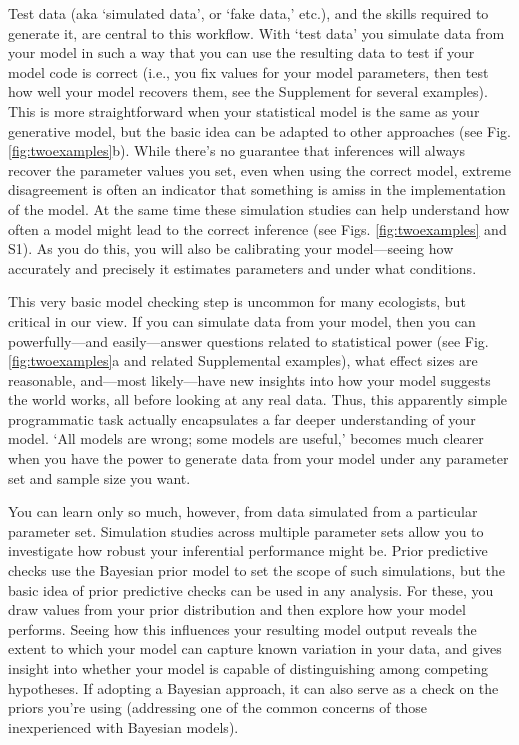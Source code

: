 \documentclass[11pt]{article}
\newcommand{\R}[1]{\label{}\linelabel{#1}}
\begin{document}
Test data (aka `simulated data', or  `fake data,' etc.), and the skills required to generate it, are central to this workflow. With `test data' you simulate data from your model in such a way that you can use the resulting data to test if your model code is correct (i.e., you fix values for your model parameters, then test how well your model recovers them, see the Supplement for several examples). This is more straightforward when your statistical model is the same as your generative model, but the basic idea can be adapted to other approaches (see Fig. \ref{fig:twoexamples}b).\R{beyondMCMC5} While there's no guarantee that inferences will always recover the parameter values you set, even when using the correct model, extreme disagreement is often an indicator that something is amiss in the implementation of the model. At the same time these simulation studies can help understand how often a model might lead to the correct inference (see Figs. \ref{fig:twoexamples} and S1). As you do this, you will also be calibrating your model---seeing how accurately and precisely it estimates parameters and under what conditions. 

This very basic model checking step is uncommon for many ecologists, but critical in our view. If you can simulate data from your model, then you can powerfully---and easily---answer questions related to statistical power (see Fig. \ref{fig:twoexamples}a and related Supplemental examples), what effect sizes are reasonable, and---most likely---have new insights into how your model suggests the world works, all before looking at any real data. Thus, this apparently simple programmatic task actually encapsulates a far deeper understanding of your model. `All models are wrong; some models are useful,' becomes much clearer when you have the power to generate data from your model under any parameter set and sample size you want.

You can learn only so much, however, from data simulated from a particular parameter set. Simulation studies across multiple parameter sets allow you to investigate how robust your inferential performance might be. Prior predictive checks \citep{betanprior,winter2023} use the Bayesian prior model to set the scope of such simulations, but the basic idea of prior predictive checks can be used in any analysis. For these, you draw values from your prior distribution and then explore how your model performs. Seeing how this influences your resulting model output 
reveals the extent to which your model can capture known variation in your data, and gives insight into whether your model is capable of distinguishing among competing hypotheses. If adopting a Bayesian approach, it can also serve as a check on the priors you're using (addressing one of the common concerns of those inexperienced with Bayesian models). 
\end{document}
